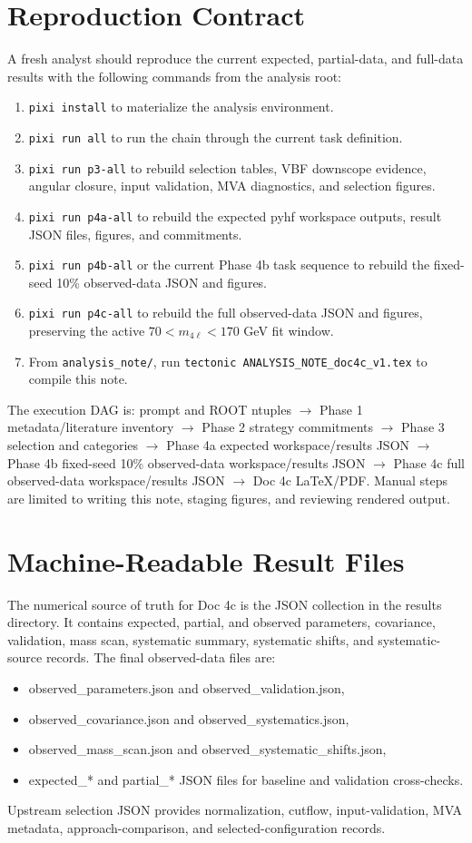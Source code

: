 \documentclass[11pt]{article}
\begin{document}
\section{Reproduction Contract}
A fresh analyst should reproduce the current expected, partial-data, and full-data results with the following commands from the analysis root:
\begin{enumerate}[leftmargin=*]
\item \texttt{pixi install} to materialize the analysis environment.
\item \texttt{pixi run all} to run the chain through the current task definition.
\item \texttt{pixi run p3-all} to rebuild selection tables, VBF downscope evidence, angular closure, input validation, MVA diagnostics, and selection figures.
\item \texttt{pixi run p4a-all} to rebuild the expected pyhf workspace outputs, result JSON files, figures, and commitments.
\item \texttt{pixi run p4b-all} or the current Phase 4b task sequence to rebuild the fixed-seed 10\% observed-data JSON and figures.
\item \texttt{pixi run p4c-all} to rebuild the full observed-data JSON and figures, preserving the active $70 < m_{4\ell} < 170$ GeV fit window.
\item From \texttt{analysis\_note/}, run \texttt{tectonic ANALYSIS\_NOTE\_doc4c\_v1.tex} to compile this note.
\end{enumerate}
The execution DAG is: prompt and ROOT ntuples $\rightarrow$ Phase 1 metadata/literature inventory $\rightarrow$ Phase 2 strategy commitments $\rightarrow$ Phase 3 selection and categories $\rightarrow$ Phase 4a expected workspace/results JSON $\rightarrow$ Phase 4b fixed-seed 10\% observed-data workspace/results JSON $\rightarrow$ Phase 4c full observed-data workspace/results JSON $\rightarrow$ Doc 4c LaTeX/PDF. Manual steps are limited to writing this note, staging figures, and reviewing rendered output.
\section{Machine-Readable Result Files}
The numerical source of truth for Doc 4c is the JSON collection in the results directory. It contains expected, partial, and observed parameters, covariance, validation, mass scan, systematic summary, systematic shifts, and systematic-source records. The final observed-data files are:
\begin{itemize}[leftmargin=*]
\item observed\_parameters.json and observed\_validation.json,
\item observed\_covariance.json and observed\_systematics.json,
\item observed\_mass\_scan.json and observed\_systematic\_shifts.json,
\item expected\_* and partial\_* JSON files for baseline and validation cross-checks.
\end{itemize}
Upstream selection JSON provides normalization, cutflow, input-validation, MVA metadata, approach-comparison, and selected-configuration records.
\clearpage


\end{document}
